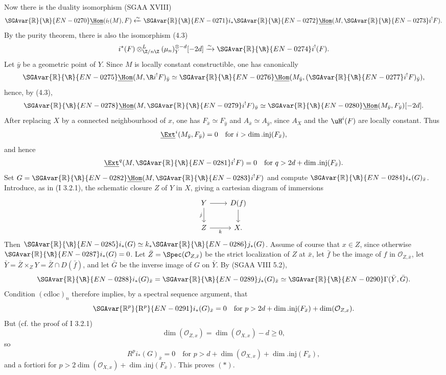 Now there is the duality isomorphism (SGAA XVIII)
\[
        \SGAvar{\mathbb{R}}{\R}{EN-0270}\underline{\Hom}(i_!(M),F)\xleftarrow{\sim} \SGAvar{\mathbb{R}}{\R}{EN-0271} i_*\SGAvar{\mathbb{R}}{\R}{EN-0272}\underline{\Hom}(M,\SGAvar{\mathbb{R}}{\R}{EN-0273} i^!F).
\]
By the purity theorem, there is also the isomorphism (4.3)
\[
        i^*(F)\otimes^L_{\Z/n\Z}(\mu_n)_Y^{\otimes -d}[-2d]\xrightarrow{\sim}\SGAvar{\mathbb{R}}{\R}{EN-0274} i^!(F).
\]
Let $\bar{y}$ be a geometric point of $Y$. Since $M$ is locally constant constructible, one has canonically
\[
        \SGAvar{\mathbb{R}}{\R}{EN-0275}\underline{\Hom}(M,\R i^!F)_{\bar{y}}\simeq \SGAvar{\mathbb{R}}{\R}{EN-0276}\underline{\Hom}(M_{\bar{y}},(\SGAvar{\mathbb{R}}{\R}{EN-0277} i^!F)_{\bar{y}}),
\]
hence, by (4.3),
\[
        \SGAvar{\mathbb{R}}{\R}{EN-0278}\underline{\Hom}(M,\SGAvar{\mathbb{R}}{\R}{EN-0279} i^!F)_{\bar{y}}\simeq \SGAvar{\mathbb{R}}{\R}{EN-0280}\underline{\Hom}(M_{\bar{y}},F_{\bar{y}})[-2d].
\]
After replacing $X$ by a connected neighbourhood of $x$, one has $F_{\bar{x}}\simeq F_{\bar{y}}$ and $A_{\bar{x}}\simeq A_{\bar{y}}$, since $A_X$ and the $\uH^i(F)$ are locally constant. Thus
\[
        \underline{\Ext}^i(M_{\bar{y}},F_{\bar{y}})=0\quad\text{for }i>\dim.\mathrm{inj}(F_{\bar{x}}),
\]
and hence
\[
        \underline{\Ext}^{q}(M,\SGAvar{\mathbb{R}}{\R}{EN-0281} i^!F)=0\quad\text{for }q>2d+\dim.\mathrm{inj}(F_{\bar{x}}).
\]
Set $G=\SGAvar{\mathbb{R}}{\R}{EN-0282}\underline{\Hom}(M,\SGAvar{\mathbb{R}}{\R}{EN-0283} i^!F)$ and compute $\SGAvar{\mathbb{R}}{\R}{EN-0284} i_*(G)_{\bar{x}}$. Introduce, as in (I 3.2.1), the schematic closure $Z$ of $Y$ in $X$, giving a cartesian diagram of immersions
\[
\begin{tikzcd}
Y \arrow[r] \arrow[d,"j"'] & D(f) \arrow[d]\\
Z \arrow[r,"k"'] & X.
\end{tikzcd}
\]
Then $\SGAvar{\mathbb{R}}{\R}{EN-0285} i_*(G)\simeq k_*\SGAvar{\mathbb{R}}{\R}{EN-0286} j_*(G)$. Assume of course that $x\in Z$, since otherwise $\SGAvar{\mathbb{R}}{\R}{EN-0287} i_*(G)=0$. Let $\bar{Z}=\Spec(\mathcal{O}_{Z,\bar{x}})$ be the strict localization of $Z$ at $\bar{x}$, let $\bar{f}$ be the image of $f$ in $\mathcal{O}_{Z,\bar{x}}$, let $\bar{Y}=\bar{Z}\times_ZY=\bar{Z}\cap D(\bar{f})$, and let $\bar{G}$ be the inverse image of $G$ on $\bar{Y}$. By (SGAA VIII 5.2),
\[
        \SGAvar{\mathbb{R}}{\R}{EN-0288} i_*(G)_{\bar{x}}=\SGAvar{\mathbb{R}}{\R}{EN-0289} j_*(G)_{\bar{x}}\simeq \SGAvar{\mathbb{R}}{\R}{EN-0290}\Gamma(\bar{Y},\bar{G}).
\]
Condition $(\mathrm{cdloc})_n$ therefore implies, by a spectral sequence argument, that
\[
        \SGAvar{\mathbb{R}^p}{\mathrm{R}^p}{EN-0291} i_*(G)_{\bar{x}}=0\quad\text{for }p>2d+\dim.\mathrm{inj}(F_{\bar{x}})+\dim(\mathcal{O}_{Z,x}).
\]
But (cf. the proof of I 3.2.1)
\[
        \dim(\mathcal{O}_{Z,x})=\dim(\mathcal{O}_{X,x})-d\geq0,
\]
so
\[
        R^p i_*(G)_{\bar{x}}=0\quad\text{for }p>d+\dim(\mathcal{O}_{X,x})+\dim.\mathrm{inj}(F_{\bar{x}}),
\]
and a fortiori for $p>2\dim(\mathcal{O}_{X,x})+\dim.\mathrm{inj}(F_{\bar{x}})$. This proves $(*)$.

